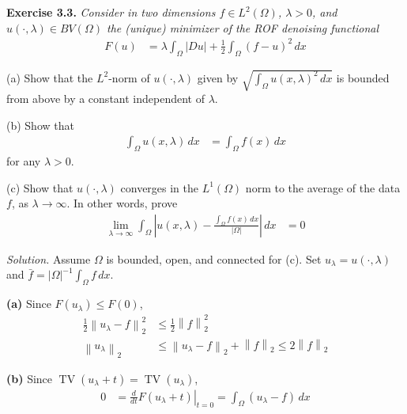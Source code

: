 \documentclass[12pt,letterpaper]{article}
\newcommand{\TV}{\operatorname{TV}}
\newcommand{\dx}{\,dx}
\newcommand{\norm}[1]{\left\lVert #1\right\rVert}
\newcommand{\exercise}[1]{%
  \par\bigskip\noindent\textbf{Exercise #1.}\enspace}
\newenvironment{statement}{\itshape\ignorespaces}{\par}
\newcommand{\solution}{\par\medskip\noindent\textit{Solution.}\enspace}
\newcommand{\partlabel}[1]{\par\medskip\noindent\textbf{(#1)}\enspace}
\begin{document}
\begin{samepage}
\exercise{3.3}
\begin{statement}
Consider in two dimensions $f\in L^2(\Omega)$, $\lambda>0$, and
$u(\cdot,\lambda)\in BV(\Omega)$ the (unique) minimizer of the ROF
denoising functional
\begin{align*}
 F(u)&=\lambda\int_\Omega|Du|+\frac12\int_\Omega(f-u)^2\,dx
\end{align*}
\par\smallskip
(a) Show that the $L^2$-norm of $u(\cdot,\lambda)$ given by
$\sqrt{\int_\Omega u(x,\lambda)^2\,dx}$ is bounded from above by a
constant independent of $\lambda$.
\par\smallskip
(b) Show that
\begin{align*}
 \int_\Omega u(x,\lambda)\,dx&=\int_\Omega f(x)\,dx
\end{align*}
for any $\lambda>0$.
\par\smallskip
(c) Show that $u(\cdot,\lambda)$ converges in the $L^1(\Omega)$ norm
to the average of the data $f$, as $\lambda\to\infty$. In other
words, prove
\begin{align*}
 \lim_{\lambda\to\infty}\int_\Omega
 \left|u(x,\lambda)-\frac{\int_\Omega f(x)\,dx}{|\Omega|}\right|\,dx&=0
\end{align*}
\end{statement}
\end{samepage}

\solution
Assume $\Omega$ is bounded, open, and connected for (c).
Set $u_\lambda=u(\cdot,\lambda)$ and
$\bar f=|\Omega|^{-1}\int_\Omega f\dx$.

\partlabel{a} Since $F(u_\lambda)\leq F(0)$,
\begin{align*}
 \frac12\norm{u_\lambda-f}_2^2&\leq\frac12\norm f_2^2\\
 \norm{u_\lambda}_2&\leq\norm{u_\lambda-f}_2+\norm f_2
 \leq2\norm f_2
\end{align*}

\partlabel{b} Since $\TV(u_\lambda+t)=\TV(u_\lambda)$,
\begin{align*}
 0&=\left.\frac{d}{dt}F(u_\lambda+t)\right|_{t=0}
   =\int_\Omega(u_\lambda-f)\dx
\end{align*}
\end{document}

